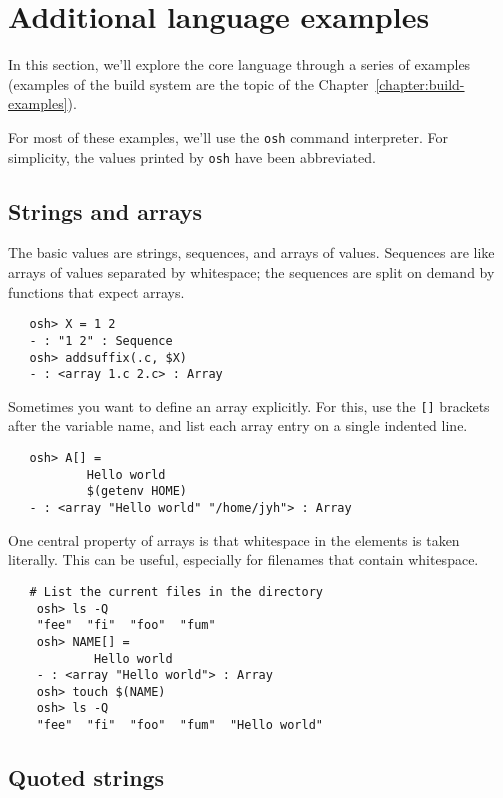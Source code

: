 %
%
\chapter{Additional language examples}
\label{chapter:language-examples}

In this section, we'll explore the core language through a series of examples (examples of the build
system are the topic of the Chapter~\ref{chapter:build-examples}).

For most of these examples, we'll use the \verb+osh+ command interpreter.  For simplicity, the
values printed by \verb+osh+ have been abbreviated.

\section{Strings and arrays}

The basic \OMake{} values are strings, sequences, and arrays of values.  Sequences are like arrays of
values separated by whitespace; the sequences are split on demand by functions that expect arrays.

\begin{verbatim}
   osh> X = 1 2
   - : "1 2" : Sequence
   osh> addsuffix(.c, $X)
   - : <array 1.c 2.c> : Array
\end{verbatim}

Sometimes you want to define an array explicitly.  For this, use the \verb+[]+ brackets after the
variable name, and list each array entry on a single indented line.

\begin{verbatim}
   osh> A[] =
           Hello world
           $(getenv HOME)
   - : <array "Hello world" "/home/jyh"> : Array
\end{verbatim}

One central property of arrays is that whitespace in the elements is taken literally.  This can be
useful, especially for filenames that contain whitespace. 

\begin{verbatim}
   # List the current files in the directory
    osh> ls -Q
    "fee"  "fi"  "foo"  "fum"
    osh> NAME[] = 
            Hello world
    - : <array "Hello world"> : Array
    osh> touch $(NAME)
    osh> ls -Q
    "fee"  "fi"  "foo"  "fum"  "Hello world"
\end{verbatim}     

\section{Quoted strings}
\label{section:quoted-strings}

